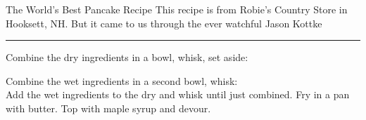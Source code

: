 \begin{recipe}{The World's Best Pancake Recipe}{}{}
\freeform This recipe is from Robie's Country Store in Hooksett, NH. But it came to us through the ever watchful Jason Kottke\\
\rule{\textwidth}{0.05pt}

Combine the dry ingredients in a bowl, whisk, set aside:

Combine the wet ingredients in a second bowl, whisk:
\newline
\\
Add the wet ingredients to the dry and whisk until just combined. Fry in a pan with butter. Top with maple syrup and devour.
\end{recipe}
  